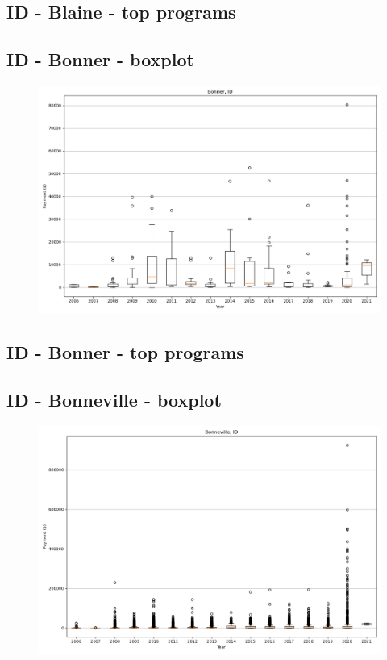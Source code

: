 \subsection*{ID - Blaine - top programs}

\newpage
\subsection*{ID - Bonner - boxplot}
\begin{figure}[h]
\centering
\includegraphics[width=7in]{../output/boxplots/counties/Bonner-ID_boxplot.png}
\end{figure}


\subsection*{ID - Bonner - top programs}

\newpage
\subsection*{ID - Bonneville - boxplot}
\begin{figure}[h]
\centering
\includegraphics[width=7in]{../output/boxplots/counties/Bonneville-ID_boxplot.png}
\end{figure}


